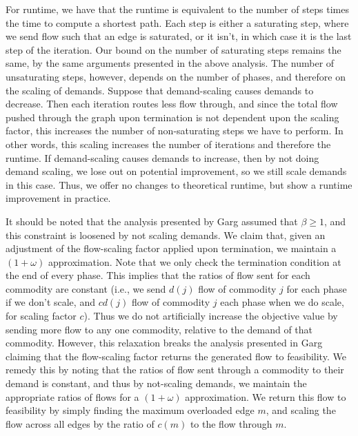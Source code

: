 For runtime, we have that the runtime is equivalent to the number of
steps times the time to compute a shortest path. Each step is either a
saturating step, where we send flow such that an edge is saturated, or
it isn't, in which case it is the last step of the iteration. Our
bound on the number of saturating steps remains the same, by the same
arguments presented in the above analysis. The number of unsaturating
steps, however, depends on the number of phases, and therefore on the
scaling of demands. Suppose that demand-scaling causes demands to
decrease. Then each iteration routes less flow through, and since the total
flow pushed through the graph upon termination is not dependent upon
the scaling factor, this increases the number of non-saturating steps
we have to perform. In other words, this scaling increases the number
of iterations and therefore the runtime. If demand-scaling causes
demands to increase, then by not doing demand scaling, we lose out on
potential improvement, so we still scale demands in this case. Thus,
we offer no changes to theoretical runtime, but show a runtime
improvement in practice.

It should be noted that the analysis presented by Garg assumed that
$\beta\geq 1$, and this constraint is loosened by not scaling
demands. We claim that, given an adjustment of the flow-scaling factor
applied upon termination, we maintain a $(1+\omega)$
approximation. Note that we only check the termination condition at
the end of every phase. This implies that the ratios of flow sent for
each commodity are constant (i.e., we send $d(j)$ flow of commodity
$j$ for each phase if we don't scale, and $cd(j)$ flow of
commodity $j$ each phase when we do scale, for scaling factor
$c$). Thus we do not artificially increase the objective value by
sending more flow to any one commodity, relative to the demand of that
commodity. However, this relaxation breaks the analysis presented in
Garg claiming that the flow-scaling factor returns the generated flow
to feasibility. We remedy this by noting that the ratios of flow sent
through a commodity to their demand is constant, and thus by
not-scaling demands, we maintain the appropriate ratios of flows for a
$(1+\omega)$ approximation. We return this flow to feasibility by
simply finding the maximum overloaded edge $m$, and scaling the flow
across all edges by the ratio of $c(m)$ to the flow through $m$. 
